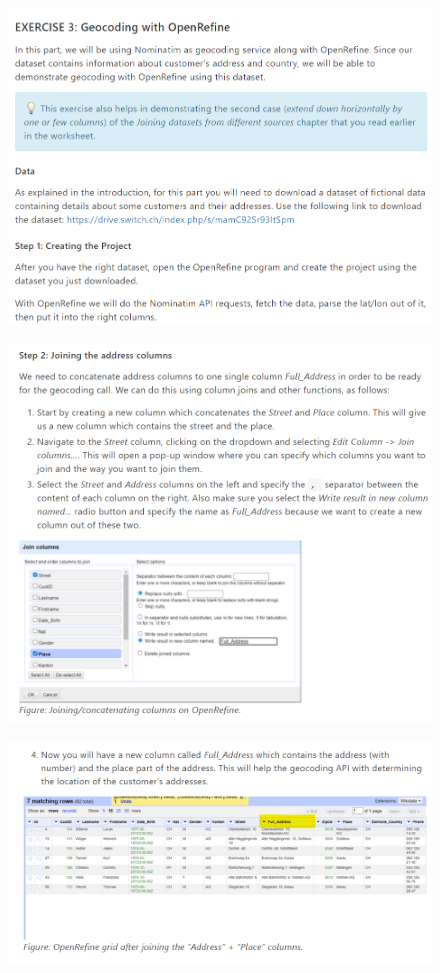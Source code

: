 \begin{figure}[H]
    \includegraphics[width=\linewidth]{./Figures/Appendices/worksheet/41.png}
\end{figure}
\begin{figure}[H]
    \includegraphics[width=\linewidth]{./Figures/Appendices/worksheet/42.png}
\end{figure}
\begin{figure}[H]
    \includegraphics[width=\linewidth]{./Figures/Appendices/worksheet/43.png}
\end{figure}

